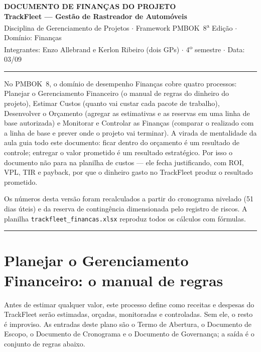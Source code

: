 \documentclass[11pt,a4paper]{article}
\newcommand{\cabecalho}[3]{%
  \begin{center}
  {\Large\bfseries DOCUMENTO DE #1 DO PROJETO}\\[2pt]
  {\large\bfseries TrackFleet --- Gestão de Rastreador de Automóveis}\\[4pt]
  Disciplina de Gerenciamento de Projetos $\cdot$ Framework PMBOK\textregistered\ 8\textsuperscript{a} Edição $\cdot$ Domínio: #2\\[2pt]
  Integrantes: Enzo Allebrand e Kerlon Ribeiro (dois GPs) $\cdot$ 4\textsuperscript{o} semestre $\cdot$ Data: #3
  \end{center}
  \vspace{2mm}\hrule\vspace{4mm}}
\newcommand{\separador}{\par\vspace{2mm}\hrule\vspace{4mm}}
\begin{document}
\cabecalho{FINANÇAS}{Finanças}{03/09}

\noindent No PMBOK\textregistered\ 8, o domínio de desempenho Finanças cobre quatro processos: Planejar o Gerenciamento Financeiro (o manual de regras do dinheiro do projeto), Estimar Custos (quanto vai custar cada pacote de trabalho), Desenvolver o Orçamento (agregar as estimativas e as reservas em uma linha de base autorizada) e Monitorar e Controlar as Finanças (comparar o realizado com a linha de base e prever onde o projeto vai terminar). A virada de mentalidade da aula guia todo este documento: ficar dentro do orçamento é um resultado de controle; entregar o valor prometido é um resultado estratégico. Por isso o documento não para na planilha de custos --- ele fecha justificando, com ROI, VPL, TIR e payback, por que o dinheiro gasto no TrackFleet produz o resultado prometido.

\noindent Os números desta versão foram recalculados a partir do cronograma nivelado (51 dias úteis) e da reserva de contingência dimensionada pelo registro de riscos. A planilha \texttt{trackfleet\_financas.xlsx} reproduz todos os cálculos com fórmulas.

\separador

\section{Planejar o Gerenciamento Financeiro: o manual de regras}\label{fin:planejar}

\noindent Antes de estimar qualquer valor, este processo define como receitas e despesas do TrackFleet serão estimadas, orçadas, monitoradas e controladas. Sem ele, o resto é improviso. As entradas deste plano são o Termo de Abertura, o Documento de Escopo, o Documento de Cronograma e o Documento de Governança; a saída é o conjunto de regras abaixo.
\end{document}
